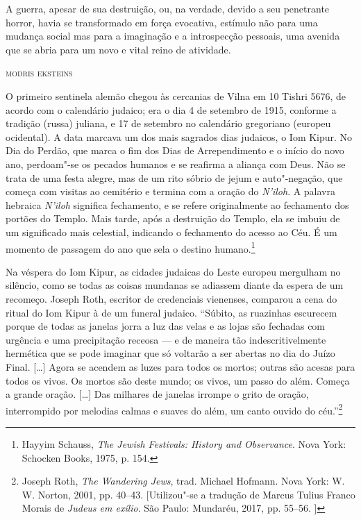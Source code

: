 \epigraph{A guerra, apesar de sua destruição, ou, na verdade, devido a seu
penetrante horror, havia se transformado em força evocativa, estímulo
não para uma mudança social mas para a imaginação e a introspecção
pessoais, uma avenida que se abria para um novo e vital reino de
atividade.}{\textsc{modris eksteins}}

O primeiro sentinela alemão chegou às cercanias de Vilna em 10 Tishri
5676, de acordo com o calendário judaico; era o dia 4 de setembro de
1915, conforme a tradição (russa) juliana, e 17 de setembro no
calendário gregoriano (europeu ocidental). A data marcava um dos mais
sagrados dias judaicos, o Iom Kipur. No Dia do Perdão, que marca o fim
dos Dias de Arrependimento e o início do novo ano, perdoam"-se os pecados
humanos e se reafirma a aliança com Deus. Não se trata de uma festa
alegre, mas de um rito sóbrio de jejum e auto"-negação, que começa com
visitas ao cemitério e termina com a oração do \textit{N'iloh}. A palavra
hebraica \textit{N'iloh} significa fechamento, e se refere originalmente
ao fechamento dos portões do Templo. Mais tarde, após a destruição do
Templo, ela se imbuiu de um significado mais celestial, indicando o
fechamento do acesso ao Céu. É um momento de passagem do ano que sela o
destino humano.\footnote{Hayyim Schauss, \textit{The Jewish Festivals: History and Observance}. Nova York: Schocken Books, 1975, p. 154.}

Na véspera do Iom Kipur, as cidades judaicas do Leste europeu mergulham
no silêncio, como se todas as coisas mundanas se adiassem diante da
espera de um recomeço. Joseph Roth, escritor de credenciais vienenses,
comparou a cena do ritual do Iom Kipur à de um funeral judaico.
``Súbito, as ruazinhas escurecem porque de todas as janelas jorra a luz
das velas e as lojas são fechadas com urgência e uma precipitação
receosa --- e de maneira tão indescritivelmente hermética que se pode
imaginar que só voltarão a ser abertas no dia do Juízo Final.
{[}\ldots{}{]} Agora se acendem as luzes para todos os mortos; outras
são acesas para todos os vivos. Os mortos são deste mundo; os vivos, um
passo do além. Começa a grande oração. {[}\ldots{}{]} Das milhares de
janelas irrompe o grito de oração, interrompido por melodias calmas e
suaves do além, um canto ouvido do céu.''\footnote{Joseph Roth, \textit{The Wandering Jews}, trad. Michael Hofmann. Nova York: W.\,W. Norton, 2001, pp. 40--43. [Utilizou"-se a tradução de Marcus Tulius Franco Morais de \textit{Judeus em exílio}. São Paulo: Mundaréu, 2017, pp. 55--56. ]}

